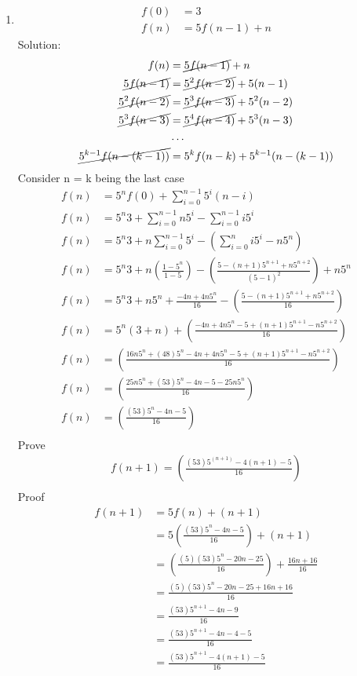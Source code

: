 \documentclass{article}
\begin{document}
\begin{enumerate}
\item
  \begin{align*}
    f(0) &= 3\\
    f(n) &= 5f(n-1) + n
  \end{align*}
  Solution:
  \begin{align*}
    f(n) &= \cancel{5f(n-1)}+n\\ 
    \cancel{5f(n-1)} &= \cancel{5^2f(n-2)} +5(n-1)\\
    \cancel{5^2f(n-2)} &= \cancel{5^3f(n-3)} +5^2(n-2)\\
    \cancel{5^3f(n-3)} &= \cancel{5^4f(n-4)} +5^3(n-3)\\
    &\ldots\\
    \cancel{5^{k-1} f(n-(k-1))} &= {5^kf(n-k)} +5^{k-1}(n-(k-1))\\
  \end{align*}
  Consider n = k being the last case
  \begin{align*}
    f(n) &= {5^nf(0)} + \sum_{i=0}^{n-1}5^i(n-i) \\
    f(n) &= 5^n3 + \sum_{i=0}^{n-1}n5^i - \sum_{i=0}^{n-1}i5^i \\
    f(n) &= 5^n3 + n\sum_{i=0}^{n-1}5^i - (\sum_{i=0}^{n}i5^i -n5^n) \\
    f(n) &= 5^n3 + n(\frac{1-5^n}{ 1 - 5}) - (\frac{5 - (n +1)5^{n+1} +n5^{n+2}}{ (5 - 1)^2})  + n5^n \\
    f(n) &= 5^n3  + n5^n + \frac{-4n+4n5^n}{ 16} - (\frac{5 - (n +1)5^{n+1} +n5^{n+2}}{ 16})  \\
    f(n) &= 5^n (3  + n) +  (\frac{ -4n+4n5^n - 5 + (n +1)5^{n+1} -n5^{n+2}}{ 16})  \\
    f(n) &=   (\frac{ 16n5^n + (48)5^n   - 4n+4n5^n - 5 + (n +1)5^{n+1} -n5^{n+2}}{ 16})  \\
    f(n) &=   (\frac{ 25n5^n + (53)5^n   - 4n - 5 -25n5^{n}}{ 16})  \\
    f(n) &=   (\frac{ (53)5^n   - 4n - 5 }{ 16})  \\
  \end{align*}
  Prove
  \begin{align*}
    f(n+1) =  (\frac{ (53)5^(n + 1)   - 4(n+1) - 5 }{ 16})  \\
  \end{align*}
  Proof
  \begin{align*}
    f(n+1) &=  5f(n) + (n + 1)  \\
    &=  5 (\frac{ (53)5^n   - 4n - 5 }{ 16}) + (n + 1)  \\
    &=   (\frac{ (5)(53)5^n   - 20n - 25 }{ 16}) + \frac{16n + 16}{16} \\
    &=   \frac{ (5)(53)5^n   - 20n - 25 + 16n + 16 }{ 16} \\
    &=   \frac{ (53)5^{n+1}   - 4n - 9 }{ 16} \\
    &=   \frac{ (53)5^{n+1}   - 4n - 4 - 5  }{ 16} \\
    &=   \frac{ (53)5^{n+1}   - 4(n + 1) - 5  }{ 16} \\
  \end{align*}

\end{enumerate}
\end{document}
